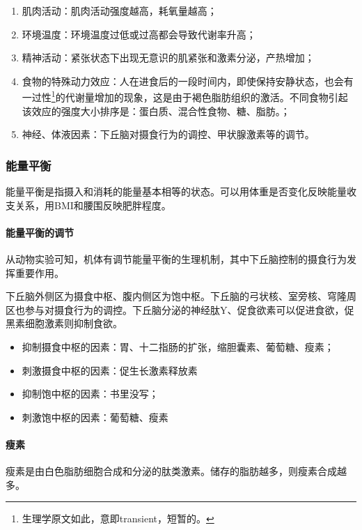 \begin{enumerate}
	\item 肌肉活动：肌肉活动强度越高，耗氧量越高；
	\item 环境温度：环境温度过低或过高都会导致代谢率升高；
	\item 精神活动：紧张状态下出现无意识的肌紧张和激素分泌，产热增加；
	\item 食物的特殊动力效应：人在进食后的一段时间内，即使保持安静状态，也会有一过性\footnote{生理学原文如此，意即transient，短暂的。}的代谢量增加的现象，这是由于褐色脂肪组织的激活。不同食物引起该效应的强度大小排序是：蛋白质、混合性食物、糖、脂肪。；
	\item 神经、体液因素：下丘脑对摄食行为的调控、甲状腺激素等的调节。
\end{enumerate}

\subsubsection{能量平衡}

能量平衡是指摄入和消耗的能量基本相等的状态。可以用体重是否变化反映能量收支关系，用BMI和腰围反映肥胖程度。

\paragraph{能量平衡的调节}

从动物实验可知，机体有调节能量平衡的生理机制，其中下丘脑控制的摄食行为发挥重要作用。

下丘脑外侧区为摄食中枢、腹内侧区为饱中枢。下丘脑的弓状核、室旁核、穹隆周区也参与对摄食行为的调控。下丘脑分泌的神经肽Y、促食欲素可以促进食欲，促黑素细胞激素则抑制食欲。

\begin{itemize}
	\item 抑制摄食中枢的因素：胃、十二指肠的扩张，缩胆囊素、葡萄糖、瘦素；
	\item 刺激摄食中枢的因素：促生长激素释放素
	\item 抑制饱中枢的因素：书里没写；
	\item 刺激饱中枢的因素：葡萄糖、瘦素
\end{itemize}

\paragraph{瘦素}

瘦素是由白色脂肪细胞合成和分泌的肽类激素。储存的脂肪越多，则瘦素合成越多。

